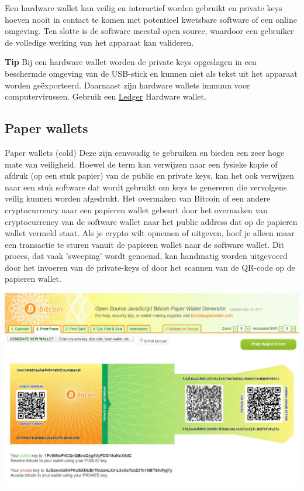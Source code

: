  Een hardware wallet kan veilig en interactief worden gebruikt en private keys hoeven nooit in contact te komen met potentieel kwetsbare software of een online omgeving. Ten slotte is de software meestal open source, waardoor een gebruiker de volledige werking van het apparaat kan valideren.\medskip


\begin{tipbox}{\textbf{Tip}}
Bij een hardware wallet worden de private keys opgeslagen in een beschermde omgeving van de USB-stick en kunnen niet als tekst uit het apparaat worden ge{\"e}xporteerd. Daarnaast zijn hardware wallets immuun voor computervirussen.
\tcblower 
Gebruik een \href{https://shop.ledger.com/pages/ledger-nano-x?r=1849e3ffabd0}{Ledger} Hardware wallet.
\end{tipbox}

\medskip

\subsection{Paper wallets}{Paper wallets (cold)}
\label{subsec:paper-wallets}
Deze zijn eenvoudig te gebruiken en bieden een zeer hoge mate van veiligheid. Hoewel de term  kan verwijzen naar een fysieke kopie of afdruk (op een stuk papier) van de public en private keys, kan het ook verwijzen naar een stuk software dat wordt gebruikt om keys te genereren die vervolgens veilig kunnen worden afgedrukt. Het overmaken van Bitcoin of een andere cryptocurrency naar een papieren wallet gebeurt door het overmaken van cryptocurrency van de software wallet naar het public address dat op de papieren wallet vermeld staat. Als je crypto wilt opnemen of uitgeven, hoef je alleen maar een transactie te sturen vanuit de papieren wallet naar de software wallet. Dit proces, dat vaak 'sweeping' wordt genoemd, kan handmatig worden uitgevoerd door het invoeren van de private-keys of door het scannen van de QR-code op de papieren wallet.

\medskip
\begin{borderbox}
    \includegraphics[width=\textwidth]{img/ch-wallets/paper-wallet-bitcoin.jpg}
\end{borderbox}
\medskip

